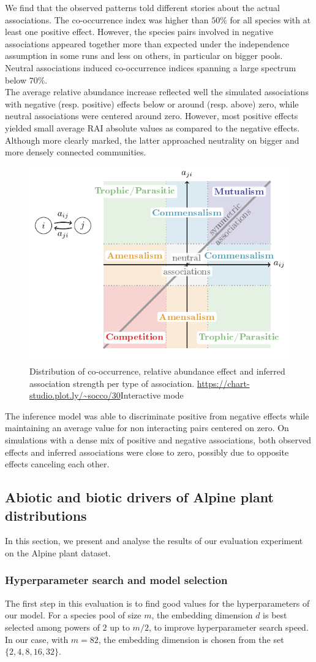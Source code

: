 \documentclass[10pt,a4paper]{article}
\newcommand{\inclPlt}[2]{\includegraphics[page=#1]{tikz_figures.pdf}}
\begin{document}
We find that the observed patterns told different stories about the actual associations. The co-occurrence index was higher than $50\%$ for all species with at least one positive effect. However, the species pairs involved in negative associations appeared together more than expected under the independence assumption in some runs and less on others, in particular on bigger pools. Neutral associations induced co-occurrence indices spanning a large spectrum below $70\%$. \\

The average relative abundance increase reflected well the simulated associations with negative (resp. positive) effects below or around (resp. above) zero, while neutral associations were centered around zero. However, most positive effects yielded small average RAI absolute values as compared to the negative effects. Although more clearly marked, the latter approached neutrality on bigger and more densely connected communities.\\

\begin{figure}[bthp]
  \centering
    \inclPlt{6}{box_simul}
	\caption{Distribution of co-occurrence, relative abundance effect and inferred association strength per type of association. \url{https://chart-studio.plot.ly/~socco/30}{Interactive mode}}
	\label{patterns}
\end{figure}

The inference model was able to discriminate positive from negative effects while maintaining an average value for non interacting pairs centered on zero. On simulations with a dense mix of positive and negative associations, both observed effects and inferred associations were close to zero, possibly due to opposite effects canceling each other. 

\subsection{Abiotic and biotic drivers of Alpine plant distributions}

In this section, we present and analyse the results of our evaluation experiment on the Alpine plant dataset.

\subsubsection{Hyperparameter search and model selection}
The first step in this evaluation is to find good values for the hyperparameters of our model. For a species pool of size $m$, the embedding dimension $d$ is best selected among powers of $2$ up to $m/2$, to improve hyperparameter search speed. In our case, with $m=82$, the embedding dimension is chosen from the set $\{2,4,8,16,32\}$. \\
\end{document}
